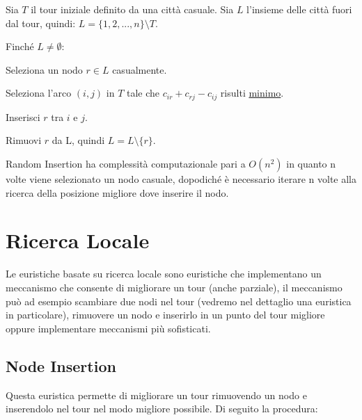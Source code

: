 \documentclass[a4paper,12pt]{report}
\begin{document}
\begin{tcolorbox}[colframe=black,colback=white,boxrule=0.5pt, sharp corners]
\begin{legal}
  \item Sia $T$ il tour iniziale definito da una città casuale. Sia $L$ l'insieme delle città fuori dal tour, quindi: $L = \{1, 2, ..., n\} \setminus T$.
  \item Finché $L \neq \emptyset$:
  \begin{legal}
    \item Seleziona un nodo $r \in L$ casualmente.
    \item Seleziona l'arco $(i, j)$ in $T$ tale che $c_{ir} + c_{rj} - c_{ij}$ risulti \underline{minimo}.
    \item Inserisci $r$ tra $i$ e $j$.  
    \item Rimuovi $r$ da L, quindi $L = L \setminus \{r\}$.
  \end{legal}
\end{legal}
\end{tcolorbox}
\hfill \break Random Insertion ha complessità computazionale pari a $O(n^2)$ in quanto n volte viene selezionato un nodo casuale, dopodiché è necessario iterare n volte alla ricerca della posizione migliore dove inserire il nodo.

\section{Ricerca Locale}
Le euristiche basate su ricerca locale\cite{Local Search} sono euristiche che implementano un meccanismo che consente di migliorare un tour (anche parziale), il meccanismo può ad esempio scambiare due nodi nel tour (vedremo nel dettaglio una euristica in particolare), rimuovere un nodo e inserirlo in un punto del tour migliore oppure implementare meccanismi più sofisticati.

\subsection{Node Insertion}
Questa euristica permette di migliorare un tour rimuovendo un nodo e inserendolo nel tour nel modo migliore possibile. Di seguito la procedura:
\end{document}
